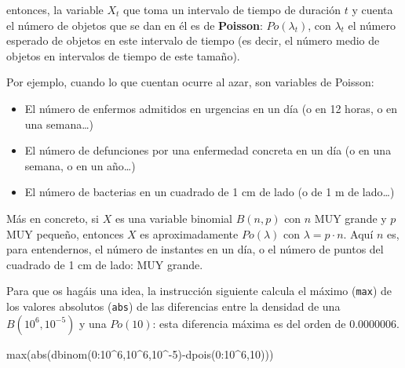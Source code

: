 \documentclass[
  spanish,
  letterpaper,
  DIV=11,
  numbers=noendperiod]{scrreprt}
\newenvironment{Shaded}{\begin{snugshade}}{\end{snugshade}}
\newcommand{\DecValTok}[1]{\textcolor[rgb]{0.68,0.00,0.00}{#1}}
\newcommand{\FunctionTok}[1]{\textcolor[rgb]{0.28,0.35,0.67}{#1}}
\newcommand{\NormalTok}[1]{\textcolor[rgb]{0.00,0.23,0.31}{#1}}
\newcommand{\SpecialCharTok}[1]{\textcolor[rgb]{0.37,0.37,0.37}{#1}}
\begin{document}
entonces, la variable \(X_t\) que toma un intervalo de tiempo de
duración \(t\) y cuenta el número de objetos que se dan en él es de
\textbf{Poisson}: \(Po(\lambda_t)\), con \(\lambda_t\) el número
esperado de objetos en este intervalo de tiempo (es decir, el número
medio de objetos en intervalos de tiempo de este tamaño).

Por ejemplo, cuando lo que cuentan ocurre al azar, son variables de
Poisson:

\begin{itemize}
\item
  El número de enfermos admitidos en urgencias en un día (o en 12 horas,
  o en una semana\ldots)
\item
  El número de defunciones por una enfermedad concreta en un día (o en
  una semana, o en un año\ldots)
\item
  El número de bacterias en un cuadrado de 1 cm de lado (o de 1 m de
  lado\ldots)
\end{itemize}

\begin{tcolorbox}[enhanced jigsaw, arc=.35mm, bottomrule=.15mm, bottomtitle=1mm, breakable, colback=white, colbacktitle=quarto-callout-note-color!10!white, colframe=quarto-callout-note-color-frame, coltitle=black, left=2mm, leftrule=.75mm, opacityback=0, opacitybacktitle=0.6, rightrule=.15mm, title=\textcolor{quarto-callout-note-color}{\faInfo}\hspace{0.5em}{Nota}, titlerule=0mm, toprule=.15mm, toptitle=1mm]

Más en concreto, si \(X\) es una variable binomial \(B(n,p)\) con \(n\)
MUY grande y \(p\) MUY pequeño, entonces \(X\) es aproximadamente
\(Po(\lambda)\) con \(\lambda=p\cdot n\). Aquí \(n\) es, para
entendernos, el número de instantes en un día, o el número de puntos del
cuadrado de 1 cm de lado: MUY grande.

Para que os hagáis una idea, la instrucción siguiente calcula el máximo
(\texttt{max}) de los valores absolutos (\texttt{abs}) de las
diferencias entre la densidad de una \(B(10^6,10^{-5})\) y una
\(Po(10)\): esta diferencia máxima es del orden de 0.0000006.

\end{tcolorbox}

\begin{Shaded}
\begin{Highlighting}[]
\FunctionTok{max}\NormalTok{(}\FunctionTok{abs}\NormalTok{(}\FunctionTok{dbinom}\NormalTok{(}\DecValTok{0}\SpecialCharTok{:}\DecValTok{10}\SpecialCharTok{\^{}}\DecValTok{6}\NormalTok{,}\DecValTok{10}\SpecialCharTok{\^{}}\DecValTok{6}\NormalTok{,}\DecValTok{10}\SpecialCharTok{\^{}{-}}\DecValTok{5}\NormalTok{)}\SpecialCharTok{{-}}\FunctionTok{dpois}\NormalTok{(}\DecValTok{0}\SpecialCharTok{:}\DecValTok{10}\SpecialCharTok{\^{}}\DecValTok{6}\NormalTok{,}\DecValTok{10}\NormalTok{)))}
\end{Highlighting}
\end{Shaded}
\end{document}
